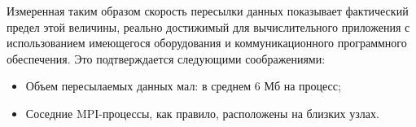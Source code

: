 			
			
			Измеренная таким образом скорость пересылки данных показывает фактический предел этой величины, реально достижимый для вычислительного приложения с использованием имеющегося оборудования и коммуникационного программного обеспечения. Это подтверждается следующими соображениями:
			\begin{itemize}
				\item Объем пересылаемых данных мал: в среднем 6 Мб на процесс;
				\item Соседние MPI-процессы, как правило, расположены на близких узлах.
			\end{itemize}  	 
			
			
			
			
